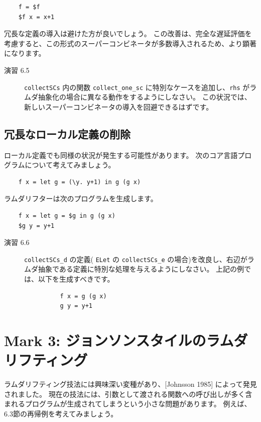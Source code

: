 \documentclass{jbook}
\begin{document}
\begin{verbatim}
    f = $f
    $f x = x+1
\end{verbatim}

冗長な定義の導入は避けた方が良いでしょう。
この改善は、完全な遅延評価を考慮すると、この形式のスーパーコンビネータが多数導入されるため、より顕著になります。

\begin{description}
	\item[演習 6.5] \texttt{collectSCs} 内の関数 \texttt{collect\_one\_sc} に特別なケースを追加し、\texttt{rhs} がラムダ抽象化の場合に異なる動作をするようにしなさい。
		この状況では、新しいスーパーコンビネータの導入を回避できるはずです。
\end{description}

\subsection{冗長なローカル定義の削除}

ローカル定義でも同様の状況が発生する可能性があります。
次のコア言語プログラムについて考えてみましょう。

\begin{verbatim}
    f x = let g = (\y. y+1) in g (g x)
\end{verbatim}

ラムダリフターは次のプログラムを生成します。

\begin{verbatim}
    f x = let g = $g in g (g x)
    $g y = y+1
\end{verbatim}

\begin{description}
	\item[演習 6.6] \texttt{collectSCs\_d} の定義( \texttt{ELet} の \texttt{collectSCs\_e} の場合)を改良し、右辺がラムダ抽象である定義に特別な処理を与えるようにしなさい。
		上記の例では、以下を生成すべきです。
		\begin{verbatim}
		  f x = g (g x)
		  g y = y+1
		\end{verbatim}
\end{description}
\newpage

\section{Mark 3: ジョンソンスタイルのラムダリフティング}

ラムダリフティング技法には興味深い変種があり、[Johnsson 1985] によって発見されました。
現在の技法には、引数として渡される関数への呼び出しが多く含まれるプログラムが生成されてしまうという小さな問題があります。
例えば、6.3節の再帰例を考えてみましょう。
\end{document}
